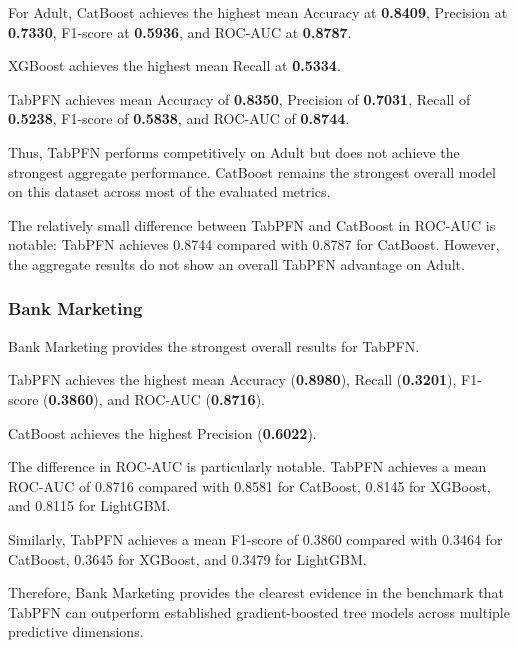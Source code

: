 For Adult, CatBoost achieves the highest mean Accuracy at \textbf{0.8409}, Precision at \textbf{0.7330}, F1-score at \textbf{0.5936}, and ROC-AUC at \textbf{0.8787}.



XGBoost achieves the highest mean Recall at \textbf{0.5334}.



TabPFN achieves mean Accuracy of \textbf{0.8350}, Precision of \textbf{0.7031}, Recall of \textbf{0.5238}, F1-score of \textbf{0.5838}, and ROC-AUC of \textbf{0.8744}.



Thus, TabPFN performs competitively on Adult but does not achieve the strongest aggregate performance. CatBoost remains the strongest overall model on this dataset across most of the evaluated metrics.



The relatively small difference between TabPFN and CatBoost in ROC-AUC is notable: TabPFN achieves 0.8744 compared with 0.8787 for CatBoost. However, the aggregate results do not show an overall TabPFN advantage on Adult.



\subsubsection{Bank Marketing}



Bank Marketing provides the strongest overall results for TabPFN.



TabPFN achieves the highest mean Accuracy (\textbf{0.8980}), Recall (\textbf{0.3201}), F1-score (\textbf{0.3860}), and ROC-AUC (\textbf{0.8716}).



CatBoost achieves the highest Precision (\textbf{0.6022}).



The difference in ROC-AUC is particularly notable. TabPFN achieves a mean ROC-AUC of 0.8716 compared with 0.8581 for CatBoost, 0.8145 for XGBoost, and 0.8115 for LightGBM.



Similarly, TabPFN achieves a mean F1-score of 0.3860 compared with 0.3464 for CatBoost, 0.3645 for XGBoost, and 0.3479 for LightGBM.



Therefore, Bank Marketing provides the clearest evidence in the benchmark that TabPFN can outperform established gradient-boosted tree models across multiple predictive dimensions.



